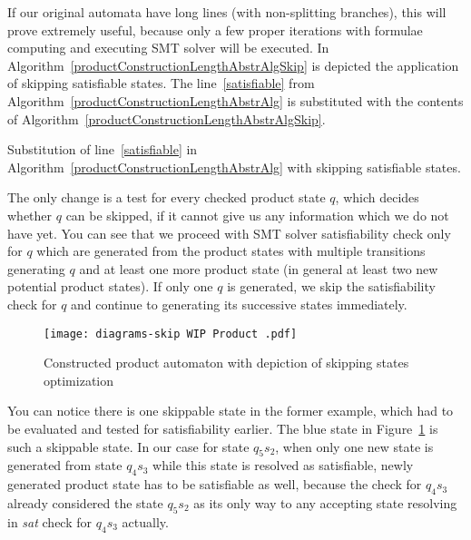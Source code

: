 If our original automata have long lines (with non-splitting branches), this will prove extremely useful, because only a few proper iterations with formulae computing and executing SMT solver will be executed. In Algorithm~\ref{productConstructionLengthAbstrAlgSkip} is depicted the application of skipping satisfiable states. The line~\ref{satisfiable} from Algorithm~\ref{productConstructionLengthAbstrAlg} is substituted with the contents of Algorithm~\ref{productConstructionLengthAbstrAlgSkip}.


\begin{algorithm}
    \caption{Substitution of line~\ref{satisfiable} in Algorithm~\ref{productConstructionLengthAbstrAlg} with skipping satisfiable states.} \label{productConstructionLengthAbstrAlgSkip}
    \DontPrintSemicolon
\end{algorithm}

The only change is a test for every checked product state $q$, which decides whether $q$ can be skipped, if it cannot give us any information which we do not have yet. You can see that we proceed with SMT solver satisfiability check only for $q$ which are generated from the product states with multiple transitions generating $q$ and at least one more product state (in general at least two new potential product states). If only one $q$ is generated, we skip the satisfiability check for $q$ and continue to generating its successive states immediately.

\begin{figure}[ht]
	\centering
	\texttt{[image: diagrams-skip WIP Product .pdf]}
	\caption{Constructed product automaton with depiction of skipping states optimization}
	\label{fig:wip_skip_product}
\end{figure}

You can notice there is one skippable state in the former example, which had to be evaluated and tested for satisfiability earlier. The blue state in Figure~\ref{fig:wip_skip_product} is such a skippable state. In our case for state $q_5s_2$, when only one new state is generated from state $q_4s_3$ while this state is resolved as satisfiable, newly generated product state has to be satisfiable as well, because the check for $q_4s_3$ already considered the state $q_5s_2$ as its only way to any accepting state resolving in \emph{sat} check for $q_4s_3$ actually.


